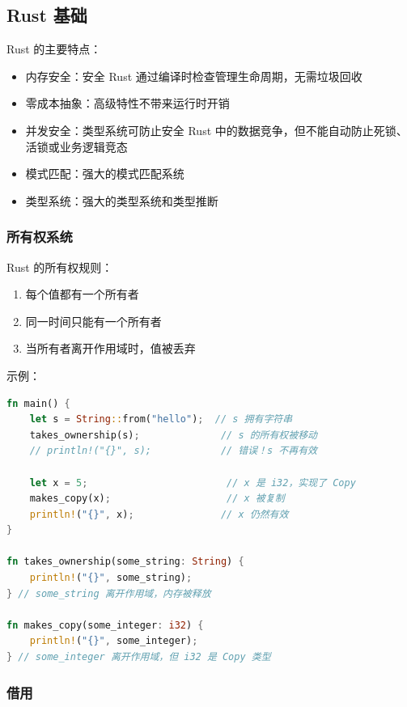 \subsection{Rust 基础}


Rust 的主要特点：
\begin{itemize}
  \item 内存安全：安全 Rust 通过编译时检查管理生命周期，无需垃圾回收
  \item 零成本抽象：高级特性不带来运行时开销
  \item 并发安全：类型系统可防止安全 Rust 中的数据竞争，但不能自动防止死锁、活锁或业务逻辑竞态
  \item 模式匹配：强大的模式匹配系统
  \item 类型系统：强大的类型系统和类型推断
\end{itemize}

\subsubsection{所有权系统}


Rust 的所有权规则：
\begin{enumerate}
  \item 每个值都有一个所有者
  \item 同一时间只能有一个所有者
  \item 当所有者离开作用域时，值被丢弃
\end{enumerate}

示例：
\begin{lstlisting}[language=Rust]
fn main() {
    let s = String::from("hello");  // s 拥有字符串
    takes_ownership(s);              // s 的所有权被移动
    // println!("{}", s);            // 错误！s 不再有效

    let x = 5;                        // x 是 i32，实现了 Copy
    makes_copy(x);                    // x 被复制
    println!("{}", x);               // x 仍然有效
}

fn takes_ownership(some_string: String) {
    println!("{}", some_string);
} // some_string 离开作用域，内存被释放

fn makes_copy(some_integer: i32) {
    println!("{}", some_integer);
} // some_integer 离开作用域，但 i32 是 Copy 类型
\end{lstlisting}

\subsubsection{借用}

